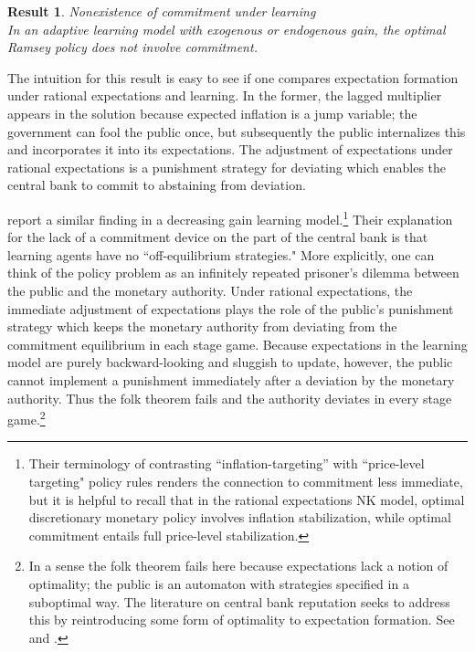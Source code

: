 \documentclass[11pt]{article}
\renewcommand{\[}{\begin{equation}}
\renewcommand{\]}{\end{equation}}
\newtheorem{result}{Result}
\begin{document}
\begin{result} Nonexistence of commitment under learning \\
In an adaptive learning model with exogenous or endogenous gain, the optimal Ramsey policy does not involve commitment. 
\label{result_no_commitment}
\end{result}

The intuition for this result is easy to see if one compares expectation formation under rational expectations and learning. In the former, the lagged multiplier appears in the solution because expected inflation is a jump variable; the government can fool the public once, but subsequently the public internalizes this and incorporates it into its expectations. The adjustment of expectations under rational expectations is a punishment strategy for deviating which enables the central bank to commit to abstaining from deviation. 

\cite{mele2019perils} report a similar finding in a decreasing gain learning model.\footnote{Their terminology of contrasting ``inflation-targeting'' with ``price-level targeting" policy rules renders the connection to commitment less immediate, but it is helpful to recall that in the rational expectations NK model, optimal discretionary monetary policy involves inflation stabilization, while optimal commitment entails full price-level stabilization.} Their explanation for the lack of a commitment device on the part of the central bank is that learning agents have no ``off-equilibrium strategies." More explicitly, one can think of the policy problem as an infinitely repeated prisoner's dilemma between the public and the monetary authority. Under rational expectations, the immediate adjustment of expectations plays the role of the public's punishment strategy which keeps the monetary authority from deviating from the commitment equilibrium in each stage game. Because expectations in the learning model are purely backward-looking and sluggish to update, however, the public cannot implement a punishment immediately after a deviation by the monetary authority. Thus the folk theorem fails and the authority deviates in every stage game.\footnote{In a sense the folk theorem fails here because expectations lack a notion of optimality; the public is an automaton with strategies specified in a suboptimal way. The literature on central bank reputation seeks to address this by reintroducing some form of optimality to expectation formation. See \cite{cho1995induction} and \cite{ireland2000expectations}. } 
\end{document}
